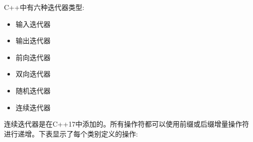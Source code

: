 C++中有六种迭代器类型:

\begin{itemize}
\item
输入迭代器

\item
输出迭代器

\item
前向迭代器

\item
双向迭代器

\item
随机迭代器

\item
连续迭代器
\end{itemize}

连续迭代器是在C++17中添加的。所有操作符都可以使用前缀或后缀增量操作符进行递增。下表显示了每个类别定义的操作:

